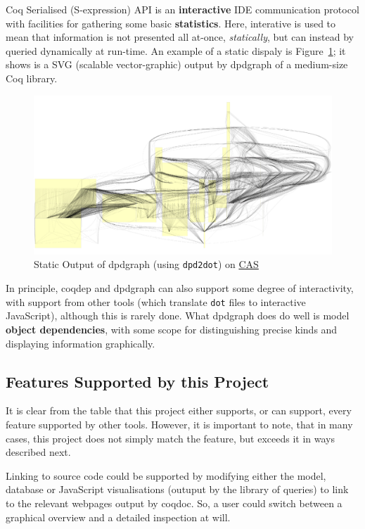Coq Serialised (S-expression) API is an \textbf{interactive} IDE communication
protocol with facilities for gathering some basic \textbf{statistics}. Here,
interative is used to mean that information is not presented all at-once,
\emph{statically}, but can instead by queried dynamically at run-time. An
example of a static dispaly is Figure~\ref{fig:static}; it shows is a SVG
(scalable vector-graphic) output by dpdgraph of a medium-size Coq library.

\begin{figure}[p]

  \centering
  \includegraphics[width=\textwidth, page=1]{img/static-CAS-small.pdf}
  \caption{Static Output of dpdgraph (using \texttt{dpd2dot}) on
    \href{https://github.com/Timothy-G-Griffin/CAS}{CAS}}\label{fig:static}

\end{figure}

In principle, coqdep and dpdgraph can also support some degree of interactivity,
with support from other tools (which translate \texttt{dot} files to interactive
JavaScript), although this is rarely done.  What dpdgraph does do well is model
\textbf{object dependencies}, with some scope for distinguishing precise kinds
and displaying information graphically.

\subsection{Features Supported by this Project}

It is clear from the table that this project either supports, or can support,
every feature supported by other tools. However, it is important to note, that
in many cases, this project does not simply match the feature, but exceeds it in
ways described next.

Linking to source code could be supported by modifying either the model,
database or JavaScript visualisations (outuput by the library of queries) to
link to the relevant webpages output by coqdoc. So, a user could switch between
a graphical overview and a detailed inspection at will.

